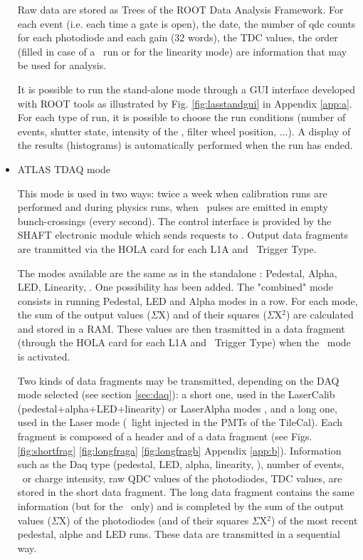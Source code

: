 \begin{itemize}
Raw data are stored as Trees of the ROOT \cite{ref:root} Data Analysis Framework. For each event (i.e. each time a gate is open), the date, the number of qdc counts for each photodiode and each gain (32 words), the TDC values, the order (filled in case of a \laser~run or for the linearity mode) are information that may be used for analysis. 

It is possible to run the stand-alone mode through a GUI interface developed with ROOT tools as illustrated by Fig. \ref{fig:lasstandgui} in Appendix \ref{app:a}. For each type of run, it is possible to choose the run conditions (number of events, shutter state, intensity of the \laser, filter wheel position, ...). A display of the results (histograms) is automatically performed when the run has ended.

\item ATLAS TDAQ mode

This mode is used in two ways: twice a week when calibration runs are performed and during physics runs, when \laser~pulses are emitted in empty bunch-crossings (every second). The control interface is provided by the SHAFT electronic module which sends requests to \lascar. Output data fragments are tranmitted via the HOLA card for each L1A and \laser~Trigger Type.

The modes available are the same as in the standalone : Pedestal, Alpha, LED, Linearity, \laser. One possibility has been added. The "combined" mode consists in running Pedestal, LED and Alpha modes in a row. For each mode, the sum of the output values ($\Sigma$X) and of their squares ($\Sigma$X$^{2}$) are calculated and stored in a RAM. These values are then trasmitted in a data fragment (through the HOLA card for each L1A and \laser~Trigger Type) when the \laser~mode is activated.

Two kinds of data fragments may be transmitted, depending on the DAQ mode selected (see section \ref{sec:daq}): a short one, used in the LaserCalib (pedestal+alpha+LED+linearity) or LaserAlpha modes , and a long one, used in the Laser mode (\laser~light injected in the PMTs of the TileCal). Each fragment is composed of a header and of a data fragment (see Figs. \ref{fig:shortfrag} \ref{fig:longfraga} \ref{fig:longfragb} Appendix \ref{app:b}). Information such as the Daq type (pedestal, LED, alpha, linearity, \laser), number of events, \laser~or charge intensity, raw QDC values of the photodiodes, TDC values, are stored in the short data fragment. The long data fragment contains the same information (but for the \laser~only) and is completed by the sum of the output values ($\Sigma$X) of the photodiodes (and of their squares $\Sigma$X$^{2}$) of the most recent pedestal, alphe and LED runs. These data are transmitted in a sequential way. 

\end{itemize}

